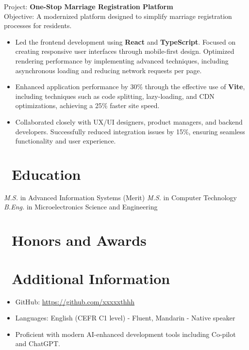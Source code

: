 \documentclass{resume}
\begin{document}
Project: \textbf{One-Stop Marriage Registration Platform} \\
Objective: A modernized platform designed to simplify marriage registration processes for residents.
\begin{itemize}
  \item Led the frontend development using \textbf{React} and \textbf{TypeScript}. Focused on creating responsive user interfaces through mobile-first design. Optimized rendering performance by implementing advanced techniques, including asynchronous loading and reducing network requests per page.
  \item Enhanced application performance by 30\% through the effective use of \textbf{Vite}, including techniques such as code splitting, lazy-loading, and CDN optimizations, achieving a 25\% faster site speed.
  \item Collaborated closely with UX/UI designers, product managers, and backend developers. Successfully reduced integration issues by 15\%, ensuring seamless functionality and user experience.
\end{itemize}

\section{\faGraduationCap\ Education}
\textit{M.S.} in Advanced Information Systems (Merit)
\textit{M.S.} in Computer Technology \\
\textit{B.Eng.} in Microelectronics Science and Engineering

\section{\faHeartO\ Honors and Awards}

\section{\faInfo\ Additional Information}
\begin{itemize}[parsep=0.5ex]
  \item GitHub: \href{https://github.com/xxxxxthhh}{https://github.com/xxxxxthhh}
  \item Languages: English (CEFR C1 level) - Fluent, Mandarin - Native speaker
  \item Proficient with modern AI-enhanced development tools including Co-pilot and ChatGPT.
\end{itemize}
\end{document}
